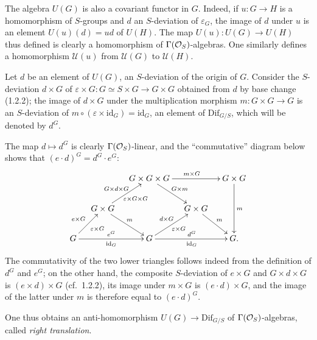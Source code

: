 The algebra $U(G)$ is also a covariant functor in $G$. Indeed, if $u:G\to H$ is a homomorphism of $S$-groups and $d$ an $S$-deviation of $\varepsilon_G$, the image of $d$ under $u$ is an element $U(u)(d)=ud$ of $U(H)$. The map $U(u):U(G)\to U(H)$ thus defined is clearly a homomorphism of $\Gamma(\mathcal{O}_S)$-algebras. One similarly defines a homomorphism $\mathscr U(u)$ from $\mathscr U(G)$ to $\mathscr U(H)$.

Let $d$ be an element of $U(G)$, \ie an $S$-deviation of the origin of $G$. Consider the $S$-deviation $d\times G$ of $\varepsilon\times G:G\simeq S\times G\to G\times G$ obtained from $d$ by base change (1.2.2); the image of $d\times G$ under the multiplication morphism $m:G\times G\to G$ is an $S$-deviation of $m\circ(\varepsilon\times\mathrm{id}_G)=\mathrm{id}_G$, \ie an element of $\mathrm{Dif}_{G/S}$, which will be denoted by $d^G$.

The map $d\mapsto d^G$ is clearly $\Gamma(\mathcal{O}_S)$-linear, and the ``commutative'' diagram below shows that $(e\cdot d)^G=d^G\cdot e^G$:
\[
\xymatrix@C=1.1em@R=2.2em{
&&G\times G\times G\ar[rr]^{m\times G}\ar[dr]^{G\times m}&&G\times G\ar[dd]^m\\
&G\times G\ar[ur]^{G\times d\times G}_{\varepsilon\times G\times G}\ar[dr]^m&&G\times G\ar[dr]^m&\\
G\ar[ur]^{e\times G}_{\varepsilon\times G}\ar[rr]^{e^G}_{\mathrm{id}_G}&&G\ar[ur]^{d\times G}_{\varepsilon\times G}\ar[rr]^{d^G}_{\mathrm{id}_G}&&G.}
\]
The commutativity of the two lower triangles follows indeed from the definition of $d^G$ and $e^G$; on the other hand, the composite $S$-deviation of $e\times G$ and $G\times d\times G$ is $(e\times d)\times G$ (cf.\ 1.2.2), its image under $m\times G$ is $(e\cdot d)\times G$, and the image of the latter under $m$ is therefore equal to $(e\cdot d)^G$.

One thus obtains an anti-homomorphism $U(G)\to\mathrm{Dif}_{G/S}$ of $\Gamma(\mathcal{O}_S)$-algebras, called \emph{right translation}.

